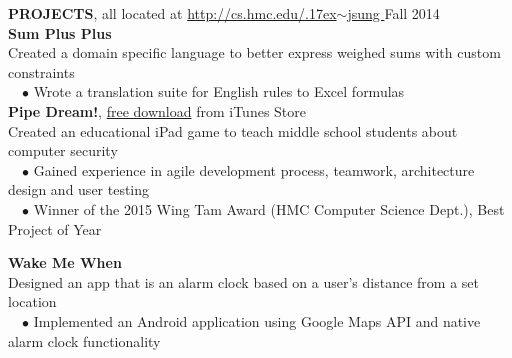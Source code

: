 \documentclass[11pt]{article}
\newcommand{\tildeText}{\raise.17ex\hbox{$\scriptstyle\sim$}}
\newcommand{\websitedisplaytext}{\small http://cs.hmc.edu/\tildeText jsung }
\newcommand{\website}{\href{http://cs.hmc.edu/~jsung}{\websitedisplaytext}}
\newcommand{\sectionNL}{\\[-2pt]}
\newcommand{\customtab}{$\hspace{10pt} \bullet \hspace{2pt}$}
\newcommand{\JudgeNudge}{\hspace{4pt}}
\newcommand{\rightAlign}{\hfill}
\begin{document}
\begin{flushleft}
{\textbf{PROJECTS}, all located at \website} \rightAlign Fall 2014 \sectionNL 
\textbf{Sum Plus Plus} \\
\JudgeNudge Created a domain specific language to better express weighed sums with custom constraints \\
\customtab Wrote a translation suite for English rules to Excel formulas \\

\textbf{Pipe Dream!}, \href{https://itunes.apple.com/us/app/pipe-dream!/id947630499?mt=8}{free download} from iTunes Store \\
\JudgeNudge Created an educational iPad game to teach middle school students about computer security\\
\customtab Gained experience in agile development process, teamwork, architecture design and user testing \\
\customtab Winner of the 2015 Wing Tam Award (HMC Computer Science Dept.), Best Project of Year 

\textbf{Wake Me When}\\
\JudgeNudge Designed an app that is an alarm clock based on a user's distance from a set location \\
\customtab Implemented an Android application using Google Maps API and native alarm clock functionality \\
 


\end{flushleft}
\end{document}
